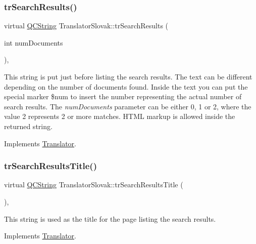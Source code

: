 \subsubsection{\texorpdfstring{trSearchResults()}{trSearchResults()}}
{\footnotesize\ttfamily virtual \mbox{\hyperlink{class_q_c_string}{Q\+C\+String}} Translator\+Slovak\+::tr\+Search\+Results (\begin{DoxyParamCaption}\item[{int}]{num\+Documents }\end{DoxyParamCaption})\hspace{0.3cm}{\ttfamily [inline]}, {\ttfamily [virtual]}}

This string is put just before listing the search results. The text can be different depending on the number of documents found. Inside the text you can put the special marker \$num to insert the number representing the actual number of search results. The {\itshape num\+Documents} parameter can be either 0, 1 or 2, where the value 2 represents 2 or more matches. H\+T\+ML markup is allowed inside the returned string. 

Implements \mbox{\hyperlink{class_translator}{Translator}}.

\mbox{\label{class_translator_slovak_a3c1f28257a7d84f51dc53714f152bb57}} 
\subsubsection{\texorpdfstring{trSearchResultsTitle()}{trSearchResultsTitle()}}
{\footnotesize\ttfamily virtual \mbox{\hyperlink{class_q_c_string}{Q\+C\+String}} Translator\+Slovak\+::tr\+Search\+Results\+Title (\begin{DoxyParamCaption}{ }\end{DoxyParamCaption})\hspace{0.3cm}{\ttfamily [inline]}, {\ttfamily [virtual]}}

This string is used as the title for the page listing the search results. 

Implements \mbox{\hyperlink{class_translator}{Translator}}.

\mbox{\label{class_translator_slovak_ac94b6848feca724b7caec676052e9a65}} 
